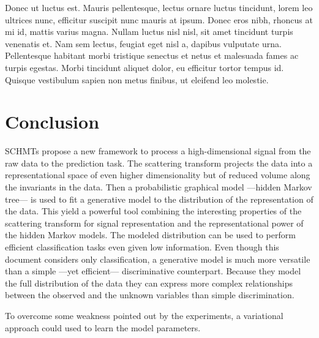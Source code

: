 \documentclass{article}
\begin{document}
		Donec ut luctus est. Mauris pellentesque, lectus ornare luctus tincidunt, lorem leo ultrices nunc, efficitur suscipit nunc mauris at ipsum. Donec eros nibh, rhoncus at mi id, mattis varius magna. Nullam luctus nisl nisl, sit amet tincidunt turpis venenatis et. Nam sem lectus, feugiat eget nisl a, dapibus vulputate urna. Pellentesque habitant morbi tristique senectus et netus et malesuada fames ac turpis egestas. Morbi tincidunt aliquet dolor, eu efficitur tortor tempus id. Quisque vestibulum sapien non metus finibus, ut eleifend leo molestie.

\section{Conclusion}
  \label{sec:Conlusion}
  SCHMTs propose a new framework to process a high-dimensional signal from the raw data to the prediction task. The scattering transform projects the data into a representational space of even higher dimensionality but of reduced volume along the invariants in the data. Then a probabilistic graphical model ---hidden Markov tree--- is used to fit a generative model to the distribution of the representation of the data. This yield a powerful tool combining the interesting properties of the scattering transform for signal representation and the representational power of the hidden Markov models. The modeled distribution can be used to perform efficient classification tasks even given low information. Even though this document considers only classification, a generative model is much more versatile than a simple ---yet efficient--- discriminative counterpart. Because they model the full distribution of the data they can express more complex relationships between the observed and the unknown variables than simple discrimination. 
  
  To overcome some weakness pointed out by the experiments, a variational approach could used to learn the model parameters. %
\end{document}
